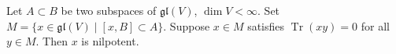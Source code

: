 Let $A \subset B$ be two subspaces of $\mathfrak{gl}(V)$, $\dim V < \infty$. Set $M = \{x \in \mathfrak{gl}(V) \mid [x, B] \subset A\}$. Suppose $x \in M$ satisfies $\operatorname{Tr}(xy) = 0$ for all $y \in M$. Then $x$ is nilpotent.
